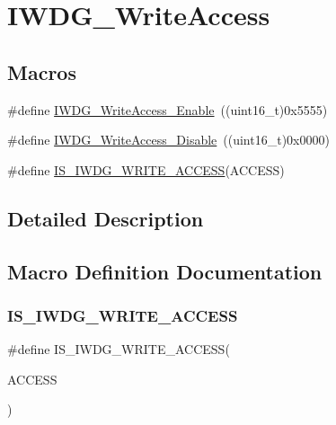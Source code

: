 \hypertarget{group___i_w_d_g___write_access}{}\section{I\+W\+D\+G\+\_\+\+Write\+Access}
\label{group___i_w_d_g___write_access}
\subsection*{Macros}
\begin{DoxyCompactItemize}
\item 
\#define \mbox{\hyperlink{group___i_w_d_g___write_access_ga86f4b926f4351e19ea069f98c2e65f91}{I\+W\+D\+G\+\_\+\+Write\+Access\+\_\+\+Enable}}~((uint16\+\_\+t)0x5555)
\item 
\#define \mbox{\hyperlink{group___i_w_d_g___write_access_ga4b395cf5b2d7ab18fc71a5f779f758cc}{I\+W\+D\+G\+\_\+\+Write\+Access\+\_\+\+Disable}}~((uint16\+\_\+t)0x0000)
\item 
\#define \mbox{\hyperlink{group___i_w_d_g___write_access_gaa89c93332f5977175f8d416b7492de18}{I\+S\+\_\+\+I\+W\+D\+G\+\_\+\+W\+R\+I\+T\+E\+\_\+\+A\+C\+C\+E\+SS}}(A\+C\+C\+E\+SS)
\end{DoxyCompactItemize}


\subsection{Detailed Description}


\subsection{Macro Definition Documentation}
\mbox{\label{group___i_w_d_g___write_access_gaa89c93332f5977175f8d416b7492de18}} 
\subsubsection{\texorpdfstring{IS\_IWDG\_WRITE\_ACCESS}{IS\_IWDG\_WRITE\_ACCESS}}
{\footnotesize\ttfamily \#define I\+S\+\_\+\+I\+W\+D\+G\+\_\+\+W\+R\+I\+T\+E\+\_\+\+A\+C\+C\+E\+SS(\begin{DoxyParamCaption}\item[{}]{A\+C\+C\+E\+SS }\end{DoxyParamCaption})}

